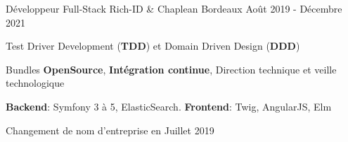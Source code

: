 \begin{cventries}
  \cventry
    {Développeur Full-Stack} %
    {Rich-ID \& Chaplean} %
    {Bordeaux} %
    {Août 2019 - Décembre 2021} %
    {
      \begin{cvitems} %
        \item {Test Driver Development (\textbf{TDD}) et Domain Driven Design (\textbf{DDD})}
         \item {Bundles \textbf{OpenSource}, \textbf{Intégration continue}, Direction technique et veille technologique}
        \item {\textbf{Backend}: Symfony 3 à 5, ElasticSearch. \textbf{Frontend}: Twig, AngularJS, Elm}
        \item {Changement de nom d'entreprise en Juillet 2019}
      \end{cvitems}
    }

\end{cventries}
